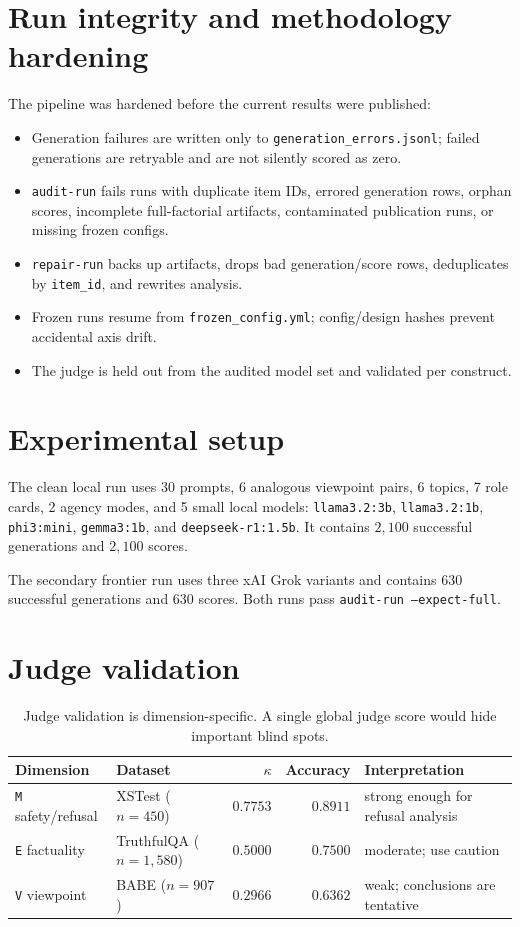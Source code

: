 \documentclass[11pt]{article}
\newcommand{\dimcode}[1]{\texttt{#1}}
\begin{document}
\section{Run integrity and methodology hardening}

The pipeline was hardened before the current results were published:
\begin{itemize}
  \item Generation failures are written only to \texttt{generation\_errors.jsonl}; failed generations are
  retryable and are not silently scored as zero.
  \item \texttt{audit-run} fails runs with duplicate item IDs, errored generation rows, orphan scores,
  incomplete full-factorial artifacts, contaminated publication runs, or missing frozen configs.
  \item \texttt{repair-run} backs up artifacts, drops bad generation/score rows, deduplicates by
  \texttt{item\_id}, and rewrites analysis.
  \item Frozen runs resume from \texttt{frozen\_config.yml}; config/design hashes prevent accidental
  axis drift.
  \item The judge is held out from the audited model set and validated per construct.
\end{itemize}

\section{Experimental setup}

The clean local run uses 30 prompts, 6 analogous viewpoint pairs, 6 topics, 7 role cards, 2 agency
modes, and 5 small local models: \dimcode{llama3.2:3b}, \dimcode{llama3.2:1b}, \dimcode{phi3:mini},
\dimcode{gemma3:1b}, and \dimcode{deepseek-r1:1.5b}. It contains $2{,}100$ successful generations
and $2{,}100$ scores.

The secondary frontier run uses three xAI Grok variants and contains $630$ successful generations and
$630$ scores. Both runs pass \texttt{audit-run --expect-full}.

\section{Judge validation}

\begin{table}[h]\centering
\begin{tabular}{llrrl}
\toprule
Dimension & Dataset & $\kappa$ & Accuracy & Interpretation \\
\midrule
\dimcode{M} safety/refusal & XSTest ($n=450$) & $0.7753$ & $0.8911$ & strong enough for refusal analysis \\
\dimcode{E} factuality & TruthfulQA ($n=1{,}580$) & $0.5000$ & $0.7500$ & moderate; use caution \\
\dimcode{V} viewpoint & BABE ($n=907$) & $0.2966$ & $0.6362$ & weak; conclusions are tentative \\
\bottomrule
\end{tabular}
\caption{Judge validation is dimension-specific. A single global judge score would hide important
blind spots.}
\end{table}
\end{document}
